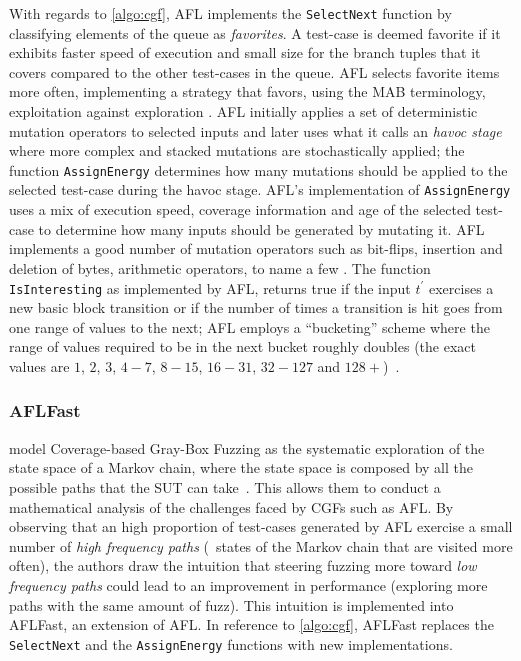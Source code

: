 With regards to \autoref{algo:cgf}, AFL implements the \texttt{SelectNext}
function by classifying elements of the queue as \emph{favorites}. A test-case
is deemed favorite if it exhibits faster speed of execution and small size for
the branch tuples that it covers compared to the other test-cases in the queue.
AFL selects favorite items more often, implementing a strategy that favors,
using the \ac{MAB} terminology, exploitation against exploration
\cite{bohme2017coverage}. AFL initially applies a set of deterministic mutation
operators to selected inputs and later uses what it calls an \emph{havoc stage}
where more complex and stacked mutations are stochastically applied; the
function \texttt{AssignEnergy} determines how many mutations should be applied
to the selected test-case during the havoc stage. AFL's implementation of
\texttt{AssignEnergy} uses a mix of execution speed, coverage information and
age of the selected test-case to determine how many inputs should be generated
by mutating it. AFL implements a good number of mutation operators such as
bit-flips, insertion and deletion of bytes, arithmetic operators, to name a few
\cite{aflmut}. The function \texttt{IsInteresting} as implemented by AFL,
returns true if the input $t^\prime$ exercises a new basic block transition or
if the number of times a transition is hit goes from one range of values to the
next; AFL employs a ``bucketing'' scheme where the range of values required to
be in the next bucket roughly doubles (the exact values are $1$, $2$, $3$,
$4-7$, $8-15$, $16-31$, $32-127$ and $128+$)~\cite{afltech}.

\subsubsection{AFLFast}
\citeauthor{bohme2017coverage} model Coverage-based Gray-Box Fuzzing as the
systematic exploration of the state space of a Markov chain, where the state
space is composed by all the possible paths that the \ac{SUT} can
take~\cite{bohme2017coverage}. This allows them to conduct a mathematical
analysis of the challenges faced by \acp{CGF} such as AFL\@. By observing that
an high proportion of test-cases generated by AFL exercise a small number of
\emph{high frequency paths} (\ie~states of the Markov chain that are visited
more often), the authors draw the intuition that steering fuzzing more toward
\emph{low frequency paths} could lead to an improvement in performance
(exploring more paths with the same amount of fuzz). This intuition is
implemented into AFLFast, an extension of AFL\@. In reference to
\autoref{algo:cgf}, AFLFast replaces the \texttt{SelectNext} and the
\texttt{AssignEnergy} functions with new implementations.

